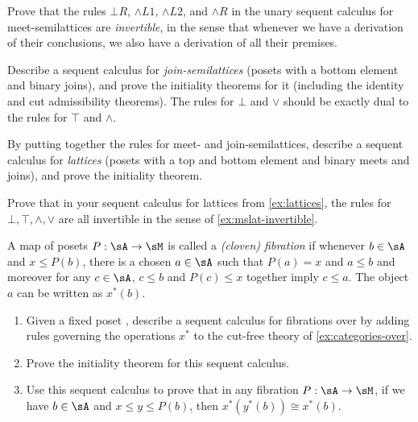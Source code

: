 \documentclass{book}
\let\meet\wedge
\def\meetL{\mathord{\meet}L}
\def\meetR{\mathord{\meet}R}
\let\join\vee
\begin{document}
\begin{ex}\label{ex:mslat-invertible}
  Prove that the rules $\bot R$, $\meetL1$, $\meetL2$, and $\meetR$ in the unary sequent calculus for meet-semilattices are \emph{invertible}, in the sense that whenever we have a derivation of their conclusions, we also have a derivation of all their premises.
\end{ex}

\begin{ex}\label{ex:jslat}
  Describe a sequent calculus for \emph{join-semilattices} (posets with a bottom element and binary joins), and prove the initiality theorems for it (including the identity and cut admissibility theorems).
  The rules for $\bot$ and $\join$ should be exactly dual to the rules for $\top$ and $\meet$.
\end{ex}

\begin{ex}\label{ex:lattices}
  By putting together the rules for meet- and join-semilattices, describe a sequent calculus for \emph{lattices} (posets with a top and bottom element and binary meets and joins), and prove the initiality theorem.
\end{ex}

\begin{ex}\label{ex:lattices-invertible}
  Prove that in your sequent calculus for lattices from \cref{ex:lattices}, the rules for $\bot,\top,\meet,\join$ are all invertible in the sense of \cref{ex:mslat-invertible}.
\end{ex}

\begin{ex}\label{ex:seqcalc-poset-fib}
  A map of posets $P:\sA\to\sM$ is called a \emph{(cloven) fibration} if whenever $b\in\sA$ and $x\le P(b)$, there is a chosen $a\in \sA$ such that $P(a)=x$ and $a\le b$ and moreover for any $c\in\sA$, $c\le b$ and $P(c)\le x$ together imply $c\le a$.
  The object $a$ can be written as $x^*(b)$.
  \begin{enumerate}
  \item Given a fixed poset \sM, describe a sequent calculus for fibrations over \sM by adding rules governing the operations $x^*$ to the cut-free theory of \cref{ex:categories-over}.
  \item Prove the initiality theorem for this sequent calculus.
  \item Use this sequent calculus to prove that in any fibration $P:\sA\to\sM$, if we have $b\in \sA$ and $x\le y\le P(b)$, then $x^*(y^*(b))\cong x^*(b)$.
  \end{enumerate}
\end{ex}
\end{document}

